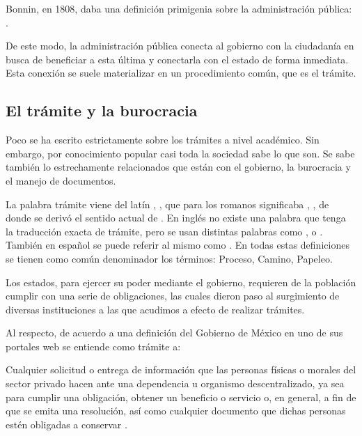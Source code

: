Bonnin, en 1808, daba una definición primigenia sobre la administración pública:
 \cite{omarguerrerobonninsigloxxi}.

De este modo, la administración pública conecta al gobierno con la ciudadanía en
busca de beneficiar a esta última y conectarla con el estado de forma inmediata.
Esta conexión se suele materializar en un procedimiento común, que es el
trámite.

\subsection{El trámite y la burocracia}

Poco se ha escrito estrictamente sobre los trámites a nivel académico. Sin
embargo, por conocimiento popular casi toda la sociedad sabe lo que son. Se sabe
también lo estrechamente relacionados que están con el gobierno, la burocracia y
el manejo de documentos.

La palabra trámite viene del latín ,
, que para los romanos significaba ,
, de donde se derivó el sentido actual de . En inglés no existe una palabra que
tenga la traducción exacta de trámite, pero se usan distintas palabras como 
,  o .
También en español se puede referir al mismo como . En todas estas definiciones se tienen como común denominador
los términos: Proceso, Camino, Papeleo.

Los estados, para ejercer su poder mediante el gobierno, requieren de la
población cumplir con una serie de obligaciones, las cuales dieron paso al
surgimiento de diversas instituciones a las que acudimos a efecto de realizar
trámites.

Al respecto, de acuerdo a una definición del Gobierno de México en uno de sus
portales web se entiende como trámite a:

\begin{displayquote}
 Cualquier solicitud o entrega de información que las
personas físicas o morales del sector privado hacen ante una dependencia u
organismo descentralizado, ya sea para cumplir una obligación, obtener un
beneficio o servicio o, en general, a fin de que se emita una resolución, así
como cualquier documento que dichas personas estén obligadas a conservar
\cite{portalmexicotramite}.
\end{displayquote}

